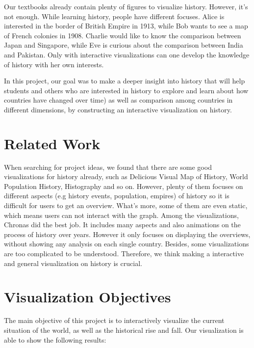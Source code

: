 \documentclass[12pt, fullpage,letterpaper]{article}
\begin{document}
Our textbooks already contain plenty of figures to visualize history. However,
it's not enough. While learning history, people have different focuses.  Alice
is interested in the border of British Empire in 1913, while Bob wants to see a
map of French colonies in 1908. Charlie would like to know the comparison
between Japan and Singapore, while Eve is curious about the comparison between
India and Pakistan.  Only with interactive visualizations can one develop the
knowledge of history with her own interests.

In this project, our goal was to make a deeper insight into history that will help
students and others who are interested in history to explore and learn about how countries
have changed over time) as well as comparison among countries in different dimensions, by constructing
an interactive visualization on history.

\section{Related Work}
When searching for project ideas, we found that there are some good
visualizations for history already, such as Delicious Visual Map of
History,
World Population
History,
Histography and so on. However, plenty of them focuses
on different aspects (e.g history events, population, empires) of history so it
is difficult for users to get an overview.  What's more, some of them are even
static, which means users can not interact with the graph. 
Among the visualizations, Chronas did the best job. It includes many aspects
and also animations on the process of history over years.
However it only focuses on displaying the overviews, without showing any analysis on each single country.
Besides, some visualizations are too complicated to be understood. Therefore, we think
making a interactive and general visualization on history is crucial.


\section{Visualization Objectives}
The main objective of this project is to interactively visualize the current situation of the world,
as well as the historical rise and fall. Our visualization is able to show the following results:
\end{document}
